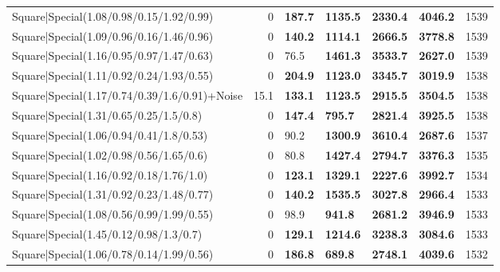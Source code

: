 \begin{tabular}{lrllllr}
 Square|Special(1.08/0.98/0.15/1.92/0.99)                      &             0   & \textbf{187.7} & \textbf{1135.5} & \textbf{2330.4} & \textbf{4046.2} &         1539 \\
 Square|Special(1.09/0.96/0.16/1.46/0.96)                      &             0   & \textbf{140.2} & \textbf{1114.1} & \textbf{2666.5} & \textbf{3778.8} &         1539 \\
 Square|Special(1.16/0.95/0.97/1.47/0.63)                      &             0   & 76.5           & \textbf{1461.3} & \textbf{3533.7} & \textbf{2627.0} &         1539 \\
 Square|Special(1.11/0.92/0.24/1.93/0.55)                      &             0   & \textbf{204.9} & \textbf{1123.0} & \textbf{3345.7} & \textbf{3019.9} &         1538 \\
 Square|Special(1.17/0.74/0.39/1.6/0.91)+Noise                 &            15.1 & \textbf{133.1} & \textbf{1123.5} & \textbf{2915.5} & \textbf{3504.5} &         1538 \\
 Square|Special(1.31/0.65/0.25/1.5/0.8)                        &             0   & \textbf{147.4} & \textbf{795.7}  & \textbf{2821.4} & \textbf{3925.5} &         1538 \\
 Square|Special(1.06/0.94/0.41/1.8/0.53)                       &             0   & 90.2           & \textbf{1300.9} & \textbf{3610.4} & \textbf{2687.6} &         1537 \\
 Square|Special(1.02/0.98/0.56/1.65/0.6)                       &             0   & 80.8           & \textbf{1427.4} & \textbf{2794.7} & \textbf{3376.3} &         1535 \\
 Square|Special(1.16/0.92/0.18/1.76/1.0)                       &             0   & \textbf{123.1} & \textbf{1329.1} & \textbf{2227.6} & \textbf{3992.7} &         1534 \\
 Square|Special(1.31/0.92/0.23/1.48/0.77)                      &             0   & \textbf{140.2} & \textbf{1535.5} & \textbf{3027.8} & \textbf{2966.4} &         1533 \\
 Square|Special(1.08/0.56/0.99/1.99/0.55)                      &             0   & 98.9           & \textbf{941.8}  & \textbf{2681.2} & \textbf{3946.9} &         1533 \\
 Square|Special(1.45/0.12/0.98/1.3/0.7)                        &             0   & \textbf{129.1} & \textbf{1214.6} & \textbf{3238.3} & \textbf{3084.6} &         1533 \\
 Square|Special(1.06/0.78/0.14/1.99/0.56)                      &             0   & \textbf{186.8} & \textbf{689.8}  & \textbf{2748.1} & \textbf{4039.6} &         1532 \\

\end{tabular}
